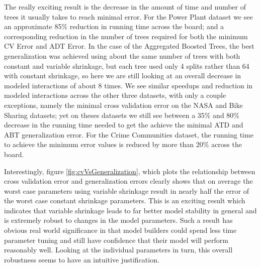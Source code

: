 \documentclass[9pt, conference]{IEEEtran}
\begin{document}
The really exciting result is the decrease in the amount of time and number of trees it usually takes to reach minimal error. For the Power Plant dataset we see an approximate 85\% reduction in running time across the board; and a corresponding reduction in the number of trees required for both the minimum CV Error and ADT Error. In the case of the Aggregated Boosted Trees, the best generalization was achieved using about the same number of trees with both constant and variable shrinkage, but each tree used only 4 splits rather than 64 with constant shrinkage, so here we are still looking at an overall decrease in modeled interactions of about 8 times. We see similar speedups and reduction in modeled interactions across the other three datasets, with only a couple exceptions, namely the minimal cross validation error on the NASA and Bike Sharing datasets; yet on theses datasets we still see between a 35\% and 80\% decrease in the running time needed to get the achieve the minimal ATD and ABT generalization error. For the Crime Communities dataset, the running time to achieve the minimum error values is reduced by more than 20\% across the board.

Interestingly, figure \ref{fig:cvVsGeneralization}, which plots the relationship between cross validation error and generalization errors clearly shows that on average the worst case parameters using variable shrinkage result in nearly half the error of the worst case constant shrinkage parameters. This is an exciting result which indicates that variable shrinkage leads to far better model stability in general and is extremely robust to changes in the model parameters. Such a result has obvious real world significance in that model builders could spend less time parameter tuning and still have confidence that their model will perform reasonably well. Looking at the individual parameters in turn, this overall robustness seems to have an intuitive justification.
\end{document}
